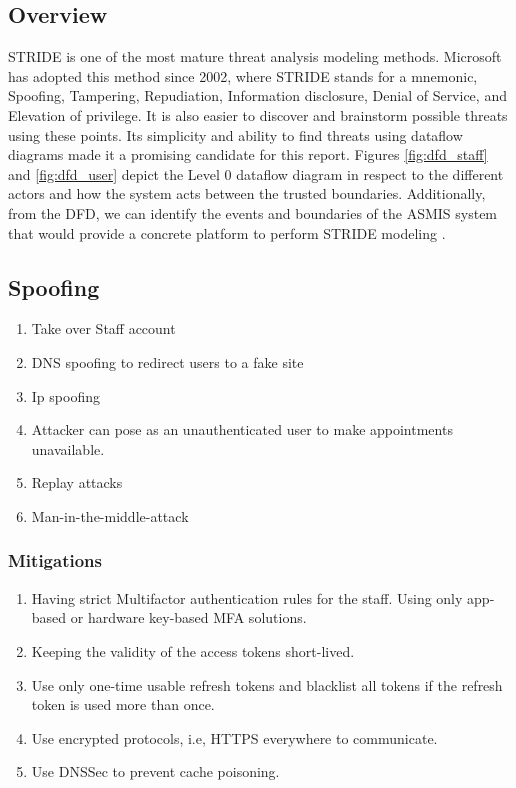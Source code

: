 \subsection{Overview}
STRIDE is one of the most mature threat analysis modeling methods. Microsoft has adopted this method since 2002, where STRIDE stands for a mnemonic, Spoofing, Tampering, Repudiation, Information disclosure, Denial of Service, and Elevation of privilege. It is also easier to discover and brainstorm possible threats using these points. Its simplicity and ability to find threats using dataflow diagrams made it a promising candidate for this report.\newline\newline
Figures \ref{fig:dfd_staff} and \ref{fig:dfd_user} depict the Level 0 dataflow diagram in respect to the different actors and how the system acts between the trusted boundaries. Additionally, from the DFD, we can identify the events and boundaries of the ASMIS system that would provide a concrete platform to perform STRIDE modeling \citep[p.~1]{shevchenko2018threat}.

\subsection{Spoofing}
\begin{enumerate}    
  \item Take over Staff account 
  \item DNS spoofing to redirect users to a fake site
  \item Ip spoofing
  \item Attacker can pose as an unauthenticated user to make appointments unavailable.
  \item Replay attacks
  \item Man-in-the-middle-attack
\end{enumerate}
\subsubsection{Mitigations}
\begin{enumerate}
    \item Having strict Multifactor authentication rules for the staff. Using only app-based or hardware key-based MFA solutions.
    \item Keeping the validity of the access tokens short-lived.
    \item Use only one-time usable refresh tokens and blacklist all tokens if the refresh token is used more than once.
    \item Use encrypted protocols, i.e, HTTPS everywhere to communicate.
    \item Use DNSSec to prevent cache poisoning.
\end{enumerate}

